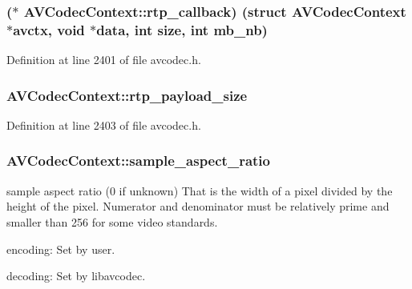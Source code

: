 \subsubsection[{\texorpdfstring{rtp\+\_\+callback}{rtp_callback}}]{($\ast$ A\+V\+Codec\+Context\+::rtp\+\_\+callback) (struct {\bf A\+V\+Codec\+Context} $\ast$avctx, {\bf void} $\ast${\bf data}, {\bf int} {\bf size}, {\bf int} mb\+\_\+nb)}\hypertarget{struct_a_v_codec_context_a74ed2f7e2b165061c13f69dd0758f107}{}\label{struct_a_v_codec_context_a74ed2f7e2b165061c13f69dd0758f107}


Definition at line 2401 of file avcodec.\+h.

\subsubsection[{\texorpdfstring{rtp\+\_\+payload\+\_\+size}{rtp_payload_size}}]{ A\+V\+Codec\+Context\+::rtp\+\_\+payload\+\_\+size}\hypertarget{struct_a_v_codec_context_a583019faf28da26e282be834cd9a7d8f}{}\label{struct_a_v_codec_context_a583019faf28da26e282be834cd9a7d8f}


Definition at line 2403 of file avcodec.\+h.

\subsubsection[{\texorpdfstring{sample\+\_\+aspect\+\_\+ratio}{sample_aspect_ratio}}]{ A\+V\+Codec\+Context\+::sample\+\_\+aspect\+\_\+ratio}\hypertarget{struct_a_v_codec_context_a5252d34fbce300228d4dbda19a8c3293}{}\label{struct_a_v_codec_context_a5252d34fbce300228d4dbda19a8c3293}
sample aspect ratio (0 if unknown) That is the width of a pixel divided by the height of the pixel. Numerator and denominator must be relatively prime and smaller than 256 for some video standards.
\begin{DoxyItemize}
\item encoding\+: Set by user.
\item decoding\+: Set by libavcodec. 
\end{DoxyItemize}

